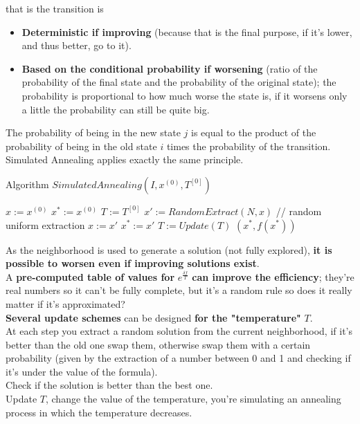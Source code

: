 that is the transition is
\begin{itemize}
	\item \textbf{Deterministic if improving} (because that is the final purpose, if it's lower, and thus better, go to it).\\
	
	\item \textbf{Based on the conditional probability if worsening} (ratio of the probability of the final state and the probability of the original state); the probability is proportional to how much worse the state is, if it worsens only a little the probability can still be quite big.\\
\end{itemize}

The probability of being in the new state $j$ is equal to the product of the probability of being in the old state $i$ times the probability of the transition.\\

Simulated Annealing applies exactly the same principle.\\

\newpage

\begin{algorithm}
	\caption{Algorithm $SimulatedAnnealing(I , x^{(0)}, T^{[0]})$}
	\begin{algorithmic}
		\STATE $x := x^{(0)}$ 
		\STATE $x^\ast := x^{(0)}$ 
		\STATE $T := T^{[0]}$
		\STATE $x' := RandomExtract(N, x)$ // random uniform extraction
		\STATE $x := x'$
		\ENDIF
		\STATE $x^\ast := x'$
		\ENDIF
		\STATE $T := Update(T )$
		\ENDWHILE
		\RETURN $(x^\ast, f (x^\ast))$
	\end{algorithmic}
\end{algorithm}

As the neighborhood is used to generate a solution (not fully explored), \textbf{it is possible to worsen even if improving solutions exist}.\\
A \textbf{pre-computed table of values for} $e^{\frac{\delta f}{T}}$ \textbf{can improve the efficiency}; they're real numbers so it can't be fully complete, but it's a random rule so does it really matter if it's approximated?\\
\textbf{Several update schemes} can be designed \textbf{for the "temperature"} $T$.\\

At each step you extract a random solution from the current neighborhood, if it's better than the old one swap them, otherwise swap them with a certain probability (given by the extraction of a number between 0 and 1 and checking if it's under the value of the formula).\\
Check if the solution is better than the best one.\\
Update $T$, change the value of the temperature, you're simulating an annealing process in which the temperature decreases.\\

